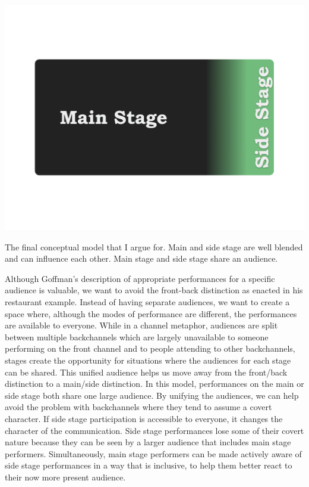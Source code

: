 \begin{marginfigure}
	\includegraphics{figures/main-side-final.png}
	\caption{The final conceptual model that I argue for. Main and side stage are well blended and can influence each other. Main stage and side stage share an audience.}
	\label{fig:main-side-stage}
\end{marginfigure}


Although Goffman's description of appropriate performances for a specific audience is valuable, we want to avoid the front-back distinction as enacted in his restaurant example. Instead of having separate audiences, we want to create a space where, although the modes of performance are different, the performances are available to everyone. While in a channel metaphor, audiences are split between multiple backchannels which are largely unavailable to someone performing on the front channel and to people attending to other backchannels, stages create the opportunity for situations where the audiences for each stage can be shared. This unified audience helps us move away from the front/back distinction to a main/side distinction. In this model, performances on the main or side stage both share one large audience. By unifying the audiences, we can help avoid the problem with backchannels where they tend to assume a covert character. If side stage participation is accessible to everyone, it changes the character of the communication. Side stage performances lose some of their covert nature because they can be seen by a larger audience that includes main stage performers. Simultaneously, main stage performers can be made actively aware of side stage performances in a way that is inclusive, to help them better react to their now more present audience.

